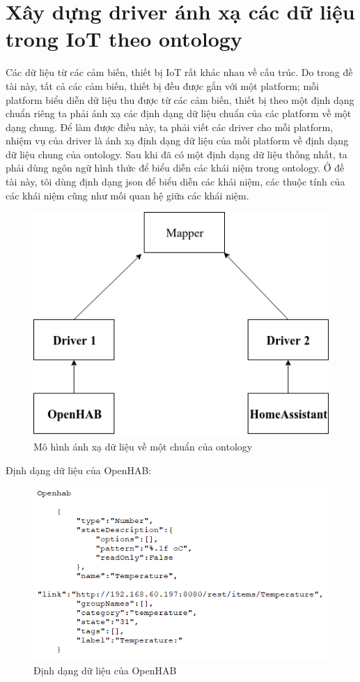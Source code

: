 \section{Xây dựng driver ánh xạ các dữ liệu trong IoT theo ontology}
Các dữ liệu từ các cảm biến, thiết bị IoT rất khác nhau về cấu trúc. Do trong đề tài này, tất cả các cảm biến, thiết bị đều được gắn với một platform; mỗi platform biểu diễn dữ liệu thu được từ các cảm biến, thiết bị theo một định dạng chuẩn riêng ta phải ánh xạ các định dạng dữ liệu chuẩn của các platform về một dạng chung. Để làm được điều này, ta phải viết các driver cho mỗi platform, nhiệm vụ của driver là ánh xạ định dạng dữ liệu của mỗi platform về định dạng dữ liệu chung của ontology.
Sau khi đã có một định dạng dữ liệu thống nhất, ta phải dùng ngôn ngữ hình thức để biểu diễn các khái niệm trong ontology. Ở đề tài này, tôi dùng định dạng json để biểu diễn các khái niệm, các thuộc tính của các khái niệm cũng như mối quan hệ giữa các khái niệm. 
\begin{figure}[h!]
	\center
	\includegraphics[scale=0.6]{image/mapping_service}
	\caption{Mô hình ánh xạ dữ liệu về một chuẩn của ontology}
\end{figure}


Định dạng dữ liệu của OpenHAB:

\begin{figure}[h!]
	\center
	\includegraphics[scale=0.6]{image/openhab_dataformat}
	\caption{Định dạng dữ liệu của OpenHAB}
\end{figure}

